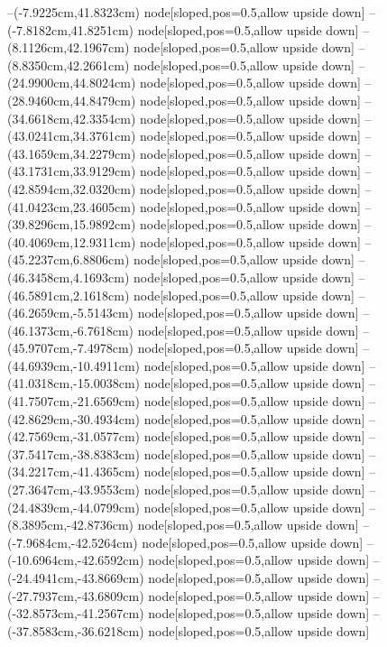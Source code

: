 --(-7.9225cm,41.8323cm) node[sloped,pos=0.5,allow upside down]{\ArrowIn}
--(-7.8182cm,41.8251cm) node[sloped,pos=0.5,allow upside down]{\arrowIn}
--(8.1126cm,42.1967cm) node[sloped,pos=0.5,allow upside down]{\ArrowIn}
--(8.8350cm,42.2661cm) node[sloped,pos=0.5,allow upside down]{\arrowIn}
--(24.9900cm,44.8024cm) node[sloped,pos=0.5,allow upside down]{\ArrowIn}
--(28.9460cm,44.8479cm) node[sloped,pos=0.5,allow upside down]{\ArrowIn}
--(34.6618cm,42.3354cm) node[sloped,pos=0.5,allow upside down]{\ArrowIn}
--(43.0241cm,34.3761cm) node[sloped,pos=0.5,allow upside down]{\ArrowIn}
--(43.1659cm,34.2279cm) node[sloped,pos=0.5,allow upside down]{\arrowIn}
--(43.1731cm,33.9129cm) node[sloped,pos=0.5,allow upside down]{\arrowIn}
--(42.8594cm,32.0320cm) node[sloped,pos=0.5,allow upside down]{\ArrowIn}
--(41.0423cm,23.4605cm) node[sloped,pos=0.5,allow upside down]{\ArrowIn}
--(39.8296cm,15.9892cm) node[sloped,pos=0.5,allow upside down]{\ArrowIn}
--(40.4069cm,12.9311cm) node[sloped,pos=0.5,allow upside down]{\ArrowIn}
--(45.2237cm,6.8806cm) node[sloped,pos=0.5,allow upside down]{\ArrowIn}
--(46.3458cm,4.1693cm) node[sloped,pos=0.5,allow upside down]{\ArrowIn}
--(46.5891cm,2.1618cm) node[sloped,pos=0.5,allow upside down]{\ArrowIn}
--(46.2659cm,-5.5143cm) node[sloped,pos=0.5,allow upside down]{\ArrowIn}
--(46.1373cm,-6.7618cm) node[sloped,pos=0.5,allow upside down]{\ArrowIn}
--(45.9707cm,-7.4978cm) node[sloped,pos=0.5,allow upside down]{\arrowIn}
--(44.6939cm,-10.4911cm) node[sloped,pos=0.5,allow upside down]{\ArrowIn}
--(41.0318cm,-15.0038cm) node[sloped,pos=0.5,allow upside down]{\ArrowIn}
--(41.7507cm,-21.6569cm) node[sloped,pos=0.5,allow upside down]{\ArrowIn}
--(42.8629cm,-30.4934cm) node[sloped,pos=0.5,allow upside down]{\ArrowIn}
--(42.7569cm,-31.0577cm) node[sloped,pos=0.5,allow upside down]{\arrowIn}
--(37.5417cm,-38.8383cm) node[sloped,pos=0.5,allow upside down]{\ArrowIn}
--(34.2217cm,-41.4365cm) node[sloped,pos=0.5,allow upside down]{\ArrowIn}
--(27.3647cm,-43.9553cm) node[sloped,pos=0.5,allow upside down]{\ArrowIn}
--(24.4839cm,-44.0799cm) node[sloped,pos=0.5,allow upside down]{\ArrowIn}
--(8.3895cm,-42.8736cm) node[sloped,pos=0.5,allow upside down]{\ArrowIn}
--(-7.9684cm,-42.5264cm) node[sloped,pos=0.5,allow upside down]{\ArrowIn}
--(-10.6964cm,-42.6592cm) node[sloped,pos=0.5,allow upside down]{\ArrowIn}
--(-24.4941cm,-43.8669cm) node[sloped,pos=0.5,allow upside down]{\ArrowIn}
--(-27.7937cm,-43.6809cm) node[sloped,pos=0.5,allow upside down]{\ArrowIn}
--(-32.8573cm,-41.2567cm) node[sloped,pos=0.5,allow upside down]{\ArrowIn}
--(-37.8583cm,-36.6218cm) node[sloped,pos=0.5,allow upside down]{\ArrowIn}
